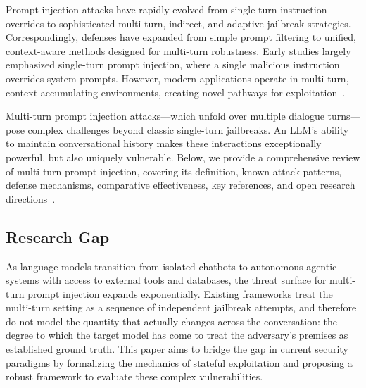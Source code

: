 \documentclass[conference]{IEEEtran}
\begin{document}
Prompt injection attacks have rapidly evolved from single-turn instruction overrides to sophisticated multi-turn, indirect, and adaptive jailbreak strategies. Correspondingly, defenses have expanded from simple prompt filtering to unified, context-aware methods designed for multi-turn robustness. Early studies largely emphasized single-turn prompt injection, where a single malicious instruction overrides system prompts. However, modern applications operate in multi-turn, context-accumulating environments, creating novel pathways for exploitation~\cite{ha2025, huang2024}.

Multi-turn prompt injection attacks---which unfold over multiple dialogue turns---pose complex challenges beyond classic single-turn jailbreaks. An LLM's ability to maintain conversational history makes these interactions exceptionally powerful, but also uniquely vulnerable. Below, we provide a comprehensive review of multi-turn prompt injection, covering its definition, known attack patterns, defense mechanisms, comparative effectiveness, key references, and open research directions~\cite{huang2024, liu2023houyi}.

\subsection{Research Gap}
As language models transition from isolated chatbots to autonomous agentic systems with access to external tools and databases, the threat surface for multi-turn prompt injection expands exponentially. Existing frameworks treat the multi-turn setting as a sequence of independent jailbreak attempts, and therefore do not model the quantity that actually changes across the conversation: the degree to which the target model has come to treat the adversary's premises as established ground truth. This paper aims to bridge the gap in current security paradigms by formalizing the mechanics of stateful exploitation and proposing a robust framework to evaluate these complex vulnerabilities.
\end{document}

